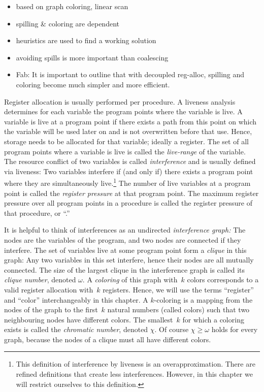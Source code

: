 {{\sl
\begin{itemize}
  \item based on graph coloring, linear scan
  \item spilling \& coloring are dependent
  \item heuristics are used to find a working solution
  \item avoiding spills is more important than coalescing
  \item Fab: It is important to outline that with decoupled reg-alloc, spilling and coloring become much simpler and more efficient.
\end{itemize}
}

Register allocation is usually performed per procedure.
A liveness analysis determines for each variable the program points where the variable is live.
A variable is live at a program point if there exists a path from this point on which the variable will be used later on and is not overwritten before that use.
Hence, storage needs to be allocated for that variable; ideally a register.
The set of all program points where a variable is live is called the \emph{live-range} of the variable.
The resource conflict of two variables is called \emph{interference} and is usually defined via liveness:
Two variables interfere if (and only if) there exists a program point where they are simultaneously live.\footnote{
This definition of interference by liveness is an overapproximation.
There are refined definitions that create less interferences.
However, in this chapter we will restrict ourselves to this definition.
}
The number of live variables at a program point is called the \emph{register pressure} at that program point. 
The maximum register pressure over all program points in a procedure is called the register pressure of that procedure, or ``\maxlive.''

It is helpful to think of interferences as an undirected \emph{interference graph:} The nodes are the variables of the program, and two nodes are connected if they interfere.
The set of variables live at some program point form a \emph{clique} in this graph:
Any two variables in this set interfere, hence their nodes are all mutually connected.
The size of the largest clique in the interference graph is called its \emph{clique number}, denoted $\omega$.
A \emph{coloring} of this graph with~$k$ colors corresponds to a valid register allocation with~$k$ registers.
Hence, we will use the terms ``register'' and ``color'' interchangeably in this chapter.
A $k$-coloring is a mapping from the nodes of the graph to the first~$k$ natural numbers (called colors) such that two neighbouring nodes have different colors.
The smallest~$k$ for which a coloring exists is called the \emph{chromatic number}, denoted $\chi$.
Of course $\chi\ge\omega$ holds for every graph, because the nodes of a clique must all have different colors.

}
